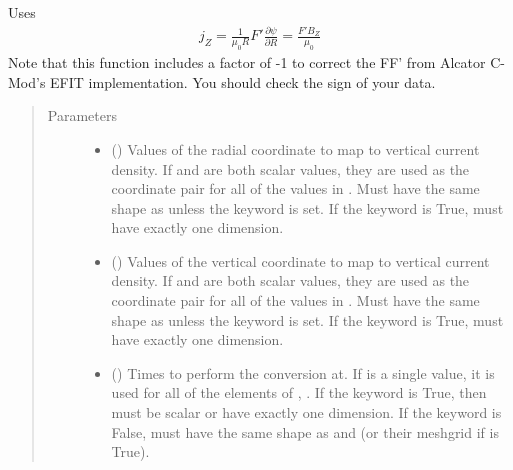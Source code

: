 \documentclass[letterpaper,10pt,english]{sphinxmanual}
\begin{document}
\begin{fulllineitems}
\begin{fulllineitems}
Uses
\begin{equation*}
\begin{split}j_Z = \frac{1}{\mu_0 R}F'\frac{\partial \psi}{\partial R} = \frac{F' B_Z}{\mu_0}\end{split}
\end{equation*}
Note that this function includes a factor of -1 to correct the FF’ from
Alcator C-Mod’s EFIT implementation. You should check the sign of your
data.
\begin{quote}\begin{description}
\item[{Parameters}] \leavevmode\begin{itemize}
\item {} 
 () \textendash{} Values of the radial coordinate to
map to vertical current density. If  and  are both scalar
values, they are used as the coordinate pair for all of the
values in . Must have the same shape as  unless the
 keyword is set. If the  keyword is True,
 must have exactly one dimension.

\item {} 
 () \textendash{} Values of the vertical coordinate to
map to vertical current density. If  and  are both scalar
values, they are used as the coordinate pair for all of the
values in . Must have the same shape as  unless the
 keyword is set. If the  keyword is True,
 must have exactly one dimension.

\item {} 
 () \textendash{} Times to perform the conversion at.
If  is a single value, it is used for all of the elements of
, . If the  keyword is True, then  must be
scalar or have exactly one dimension. If the  keyword is
False,  must have the same shape as  and  (or their
meshgrid if  is True).


\end{itemize}
\end{description}
\end{quote}
\end{fulllineitems}
\end{fulllineitems}
\end{document}
